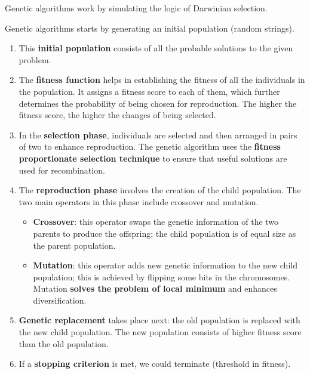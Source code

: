\documentclass{article}
\begin{document}
Genetic algorithms work by simulating the logic of Darwinian selection. 

Genetic algorithms starts by generating an initial population (random strings). 

\begin{enumerate}
    \item This \textbf{initial population} consists of all the probable solutions to the given problem.

    \item The \textbf{fitness function} helps in establishing the fitness of all the individuals in the population. It assigns a fitness score to each of them, which further determines the probability of being chosen for reproduction. The higher the fitness score, the higher the changes of being selected.

    \item In the \textbf{selection phase}, individuals are selected and then arranged in pairs of two to enhance reproduction. The genetic algorithm uses the \textbf{fitness proportionate selection technique} to ensure that useful solutions are used for recombination.

    \item The \textbf{reproduction phase} involves the creation of the child population. The two main operators in this phase include crossover and mutation.

    \begin{itemize}
        \item \textbf{Crossover}: this operator swaps the genetic information of the two parents to produce the offspring; the child population is of equal size as the parent population.
        \item \textbf{Mutation}: this operator adds new genetic information to the new child population; this is achieved by flipping some bits in the chromosomes. Mutation \textbf{solves the problem of local minimum} and enhances diversification.
    \end{itemize}

    \item \textbf{Genetic replacement} takes place next: the old population is replaced with the new child population. The new population consists of higher fitness score than the old population.

    \item If a \textbf{stopping criterion} is met, we could terminate (threshold in fitness).
\end{enumerate}
\end{document}
